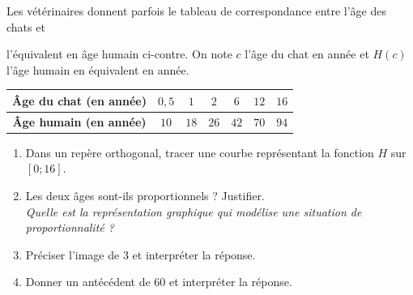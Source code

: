 \documentclass[11pt]{article}
\begin{document}
\begin{exo}
Les vétérinaires donnent parfois le tableau de
correspondance entre l'\^age des chats et 
\begin{minipage}[]{.4\textwidth}
l'équivalent en \^age humain ci-contre. On note $c$ l'\^age du chat en année et
$H(c)$ l'\^age humain en équivalent en année.
\end{minipage}
\begin{minipage}{.6\textwidth}
\begin{center}
\begin{tabular}{ccccccc}
  \toprule
  \textbf{\^Age du chat (en année)} & $0,5$ & $1$ & $2$ & $6$ & $12$ & $16$ \\
  \midrule
  \textbf{\^Age humain (en année)} & $10$ & $18$ & $26$ & $42$ & $70$ & $94$ \\
  \bottomrule
\end{tabular}
  \end{center}
\end{minipage}
\begin{enumerate}
  \item Dans un repère orthogonal, tracer une courbe représentant la fonction
    $H$ sur $[0;16]$.
  \item Les deux \^ages sont-ils proportionnels ? Justifier.\\\emph{Quelle est
    la représentation graphique qui modélise une situation de proportionnalité ?}
  \item Préciser l'image de $3$ et interpréter la réponse.
  \item Donner un antécédent de $60$ et interpréter la réponse.
\end{enumerate}
\end{exo}
\end{document}
